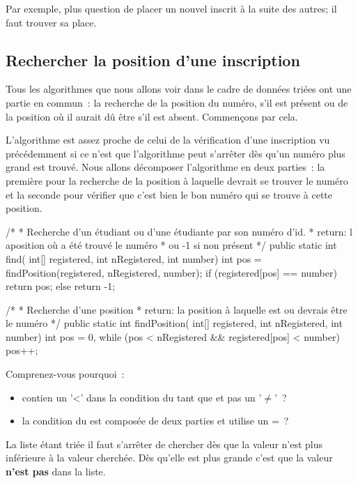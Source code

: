 		Par exemple, plus question de placer un nouvel inscrit à la suite des
		autres; il faut trouver sa place.
		
		\subsection{Rechercher la position d’une inscription}

			Tous les algorithmes que nous allons voir dans le cadre de données
			triées ont une partie en commun~: la recherche de la position du
			numéro, s’il est présent ou de la position où il aurait dû être s’il
			est absent.  Commençons par cela.
			
			L’algorithme est assez proche de celui de la vérification d’une
			inscription vu précédemment si ce n’est que l'algorithme peut
			s’arrêter dès qu'un numéro plus grand est trouvé. Nous allons
			décomposer l'algorithme en deux parties~: la première pour la
			recherche de la position à laquelle devrait se trouver le numéro et
			la seconde pour vérifier que c'est bien le bon numéro qui se trouve
			à cette position. 
			
			\begin{java}
/*
 * Recherche d'un étudiant ou d'une étudiante par son numéro d'id.
 * return: l aposition où a été trouvé le numéro 
 * ou -1 si non présent
 */
public static int find(
	int[] registered,
	int nRegistered,
	int number){
		int pos = findPosition(registered, nRegistered, number);
		if (registered[pos] == number){
			return pos;
		} else {
			return -1;
		}
}

/*
 * Recherche d'une position
 * return: la position à laquelle est ou devrais être le numéro
 */
public static int findPosition(
	int[] registered,
	int nRegistered,
	int number){
		int pos = 0,
		while (pos < nRegistered && registered[pos] < number){
			pos++;
		}
}
			\end{java}
			
			Comprenez-vous pourquoi~:
			\begin{itemize}
			\item
				 contien un '<' dans la 
				condition du tant que et pas un '$\neq$'~?
			\item
				la condition du  est composée de deux parties
				et utilise un =~?
			\end{itemize}

			La liste étant triée il faut s'arrêter de chercher dès que la valeur
			n'est plus inférieure à la valeur cherchée. Dès qu'elle est plus
			grande c'est que la valeur \textbf{n'est pas} dans la liste. 

